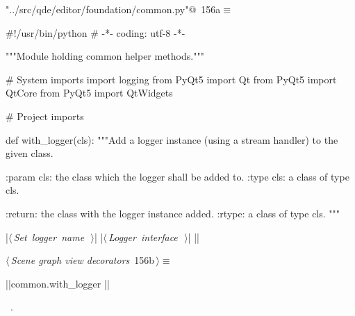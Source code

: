 \documentclass[%
    a4paper,    %
    justified,  %
    nobib,      %
    openany     %
]{tufte-book}
\begin{document}
\begin{flushleft} \small
\begin{minipage}{\linewidth}\label{scrap176}\raggedright\small
{} \verb@"../src/qde/editor/foundation/common.py"@\nobreak\ {\footnotesize {156a}}$\equiv$
\vspace{-1ex}
\begin{pythoncode}
#!/usr/bin/python
# -*- coding: utf-8 -*-

"""Module holding common helper methods."""

# System imports
import logging
from PyQt5 import Qt
from PyQt5 import QtCore
from PyQt5 import QtWidgets

# Project imports


def with_logger(cls):
    """Add a logger instance (using a stream handler) to the given class.

    :param cls: the class which the logger shall be added to.
    :type  cls: a class of type cls.

    :return: the class with the logger instance added.
    :rtype:  a class of type cls.
    """

    |\hbox{$\langle\,${\itshape Set logger name}\nobreak\ {\footnotesize {}}$\,\rangle$}|
    |\hbox{$\langle\,${\itshape Logger interface}\nobreak\ {\footnotesize {}}$\,\rangle$}|
|\NWsep|
\end{pythoncode}
\vspace{1.5ex}
\footnotesize
\begin{list}{}{\setlength{\itemsep}{-\parsep}\setlength{\itemindent}{-\leftmargin}}

\item{}
\end{list}
\end{minipage}\vspace{4ex}
\end{flushleft}
\begin{flushleft} \small
\begin{minipage}{\linewidth}\label{scrap177}\raggedright\small
{} $\langle\,${\itshape Scene graph view decorators}\nobreak\ {\footnotesize {156b}}$\,\rangle\equiv$
\vspace{-1ex}
\begin{pythoncode}
|\normalfont{}\fontfamily{}|common.with_logger
|\NWsep|
\end{pythoncode}
\vspace{1.5ex}
\footnotesize
\begin{list}{}{\setlength{\itemsep}{-\parsep}\setlength{\itemindent}{-\leftmargin}}
\item \NWtxtMacroRefIn\ .

\item{}
\end{list}
\end{minipage}\vspace{4ex}
\end{flushleft}
\end{document}
